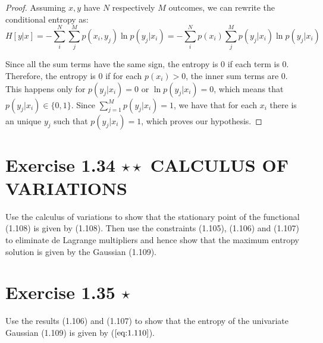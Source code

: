 \vspace{1em}

\begin{proof}
    Assuming $x, y$ have $N$ respectively $M$ outcomes,
    we can rewrite the conditional entropy as:
    \[
        H[y | x] 
        = -\sum_{i}^N  \sum_{j}^{M} p(x_i, y_j) \ln p(y_j | x_i)
        = -\sum_{i}^{N} p(x_i) \sum_{j}^{M} p(y_j | x_i) \ln p(y_j | x_i)
    \] 

    Since all the sum terms have the same sign, the entropy
    is 0 if each term is 0. Therefore, the entropy is 0 if
    for each $p(x_i) > 0$, the inner sum terms are 0. This
    happens only for $p(y_j | x_i) = 0$ or $\ln p(y_j | x_i) = 0$,
    which means that $p(y_j | x_i) \in \{0, 1\}$. Since $\displaystyle
    \sum_{j = 1}^{M} p(y_j | x_i) = 1$, we have that for each
    $x_i$ there is an unique $y_j$ such that $p(y_j | x_i) = 1$, which
    proves our hypothesis.
\end{proof}

\section*{Exercise 1.34 $\star \star$ CALCULUS OF VARIATIONS}
Use the calculus of variations to show that the stationary point
of the functional (1.108) is given by (1.108). Then use the constraints
(1.105), (1.106) and (1.107) to eliminate de Lagrange multipliers and
hence show that the maximum entropy solution is given by the Gaussian (1.109).

\section*{Exercise 1.35 $\star$}
Use the results (1.106) and (1.107) to show that the entropy of the 
univariate Gaussian (1.109) is given by ($\ref{eq:1.110}$).

\vspace{1em}

